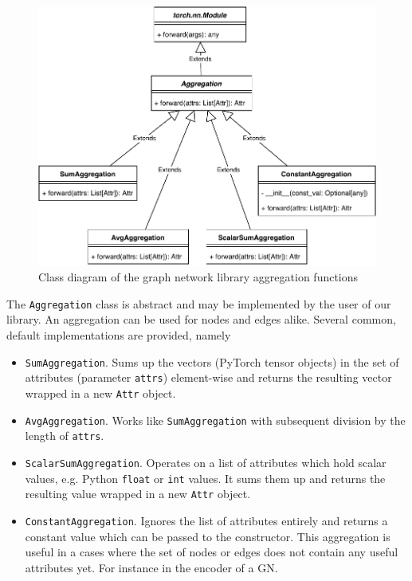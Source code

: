 \begin{figure}\centering
    \includegraphics[scale=0.65]{resources/graphnets-functions-aggr}
    \caption{Class diagram of the graph network library aggregation functions}\label{fig:classdiagramgnfunctionsaggr}
\end{figure}

The \texttt{Aggregation} class is abstract and may be implemented by the user of our library. An aggregation can be used for nodes and edges alike. Several common, default implementations are provided, namely

\begin{itemize}
    \item \texttt{SumAggregation}. Sums up the vectors (PyTorch tensor objects) in the set of attributes (parameter \texttt{attrs}) element-wise and returns the resulting vector wrapped in a new \texttt{Attr} object.
    \item \texttt{AvgAggregation}. Works like \texttt{SumAggregation} with subsequent division by the length of \texttt{attrs}.
    \item \texttt{ScalarSumAggregation}. Operates on a list of attributes which hold scalar values, e.g. Python \texttt{float} or \texttt{int} values. It sums them up and returns the resulting value wrapped in a new \texttt{Attr} object.
    \item \texttt{ConstantAggregation}. Ignores the list of attributes entirely and returns a constant value which can be passed to the constructor. This aggregation is useful in a cases where the set of nodes or edges does not contain any useful attributes yet. For instance in the encoder of a GN.
\end{itemize}


